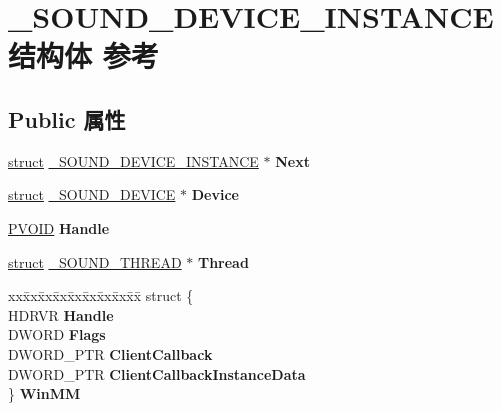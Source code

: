 \hypertarget{struct___s_o_u_n_d___d_e_v_i_c_e___i_n_s_t_a_n_c_e}{}\section{\+\_\+\+S\+O\+U\+N\+D\+\_\+\+D\+E\+V\+I\+C\+E\+\_\+\+I\+N\+S\+T\+A\+N\+C\+E结构体 参考}
\label{struct___s_o_u_n_d___d_e_v_i_c_e___i_n_s_t_a_n_c_e}
\subsection*{Public 属性}
\begin{DoxyCompactItemize}
\item 
\mbox{\label{struct___s_o_u_n_d___d_e_v_i_c_e___i_n_s_t_a_n_c_e_a08e07608e2cb4da44d63530bfb0973a2}} 
\hyperlink{interfacestruct}{struct} \hyperlink{struct___s_o_u_n_d___d_e_v_i_c_e___i_n_s_t_a_n_c_e}{\+\_\+\+S\+O\+U\+N\+D\+\_\+\+D\+E\+V\+I\+C\+E\+\_\+\+I\+N\+S\+T\+A\+N\+CE} $\ast$ {\bfseries Next}
\item 
\mbox{\label{struct___s_o_u_n_d___d_e_v_i_c_e___i_n_s_t_a_n_c_e_aed124bee8219cf872f7d2572626f48c2}} 
\hyperlink{interfacestruct}{struct} \hyperlink{struct___s_o_u_n_d___d_e_v_i_c_e}{\+\_\+\+S\+O\+U\+N\+D\+\_\+\+D\+E\+V\+I\+CE} $\ast$ {\bfseries Device}
\item 
\mbox{\label{struct___s_o_u_n_d___d_e_v_i_c_e___i_n_s_t_a_n_c_e_a10ff528095bfed34db7a91e1554be4cc}} 
\hyperlink{interfacevoid}{P\+V\+O\+ID} {\bfseries Handle}
\item 
\mbox{\label{struct___s_o_u_n_d___d_e_v_i_c_e___i_n_s_t_a_n_c_e_accaba5f357eb66e357b5cc4c596dae04}} 
\hyperlink{interfacestruct}{struct} \hyperlink{struct___s_o_u_n_d___t_h_r_e_a_d}{\+\_\+\+S\+O\+U\+N\+D\+\_\+\+T\+H\+R\+E\+AD} $\ast$ {\bfseries Thread}
\item 
\mbox{\label{struct___s_o_u_n_d___d_e_v_i_c_e___i_n_s_t_a_n_c_e_a8035e8ef127945ba664623cb851fb21b}} 
\begin{tabbing}
xx\=xx\=xx\=xx\=xx\=xx\=xx\=xx\=xx\=\kill
struct \{\\
\>HDRVR {\bfseries Handle}\\
\>DWORD {\bfseries Flags}\\
\>DWORD\_PTR {\bfseries ClientCallback}\\
\>DWORD\_PTR {\bfseries ClientCallbackInstanceData}\\
\} {\bfseries WinMM}\\


\end{tabbing}
\end{DoxyCompactItemize}

